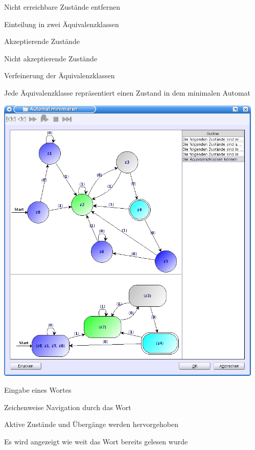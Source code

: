 {
    \begin{itemgroup}{}
	\item Nicht erreichbare Zustände entfernen
	\item Einteilung in zwei Äquivalenzklassen
		\begin{itemgroup}{}
		\item Akzeptierende Zustände
		\item Nicht akzeptierende Zustände
		\end{itemgroup}
	\item Verfeinerung der Äquivalenzklassen
	\item Jede Äquivalenzklasse repräsentiert einen Zustand in dem minimalen
	Automat
	\end{itemgroup}
	
	\vfill{}    
}


{
  \begin{center}
    \includegraphics[height=14cm]{../images/minimize.png}
  \end{center}   
}


{
    \begin{itemgroup}{}
	\item Eingabe eines Wortes
	\item Zeichenweise Navigation durch das Wort
	\item Aktive Zustände und Übergänge werden hervorgehoben
	\item Es wird angezeigt wie weit das Wort bereits gelesen wurde
	\end{itemgroup}

	\vfill{}
}


